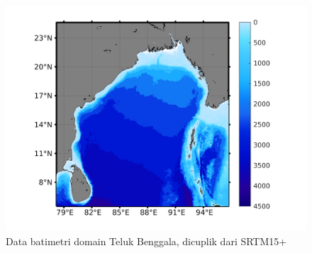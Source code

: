 \begin{spacing}{1.5}
\begin{figure}[H]
		\includegraphics[width=12cm]{contents/Topo_2}
		\caption{Data batimetri domain Teluk Benggala, dicuplik dari SRTM15+}
		\label{fig:domain_1}
	\end{figure}
\end{spacing}
\vspace{-1pc}
